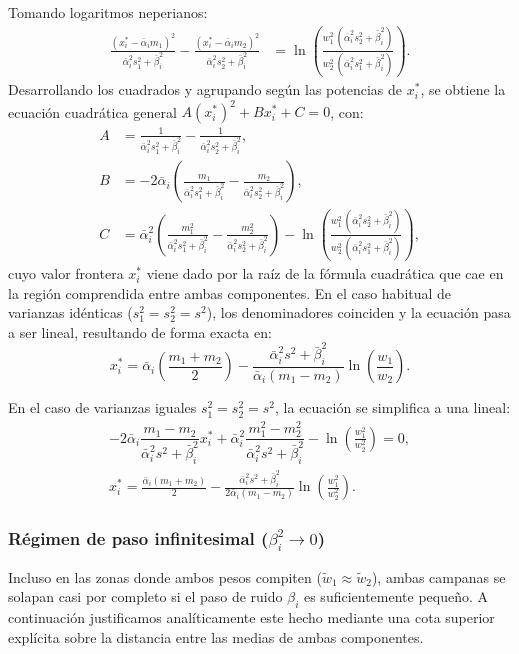 \documentclass[11pt,a4paper]{article}
\begin{document}
Tomando logaritmos neperianos:
\begin{align*}
\frac{(x_i^* - \bar{\alpha}_i m_1)^2}{\bar{\alpha}_i^2 s_1^2 + \bar{\beta}_i^2} - \frac{(x_i^* - \bar{\alpha}_i m_2)^2}{\bar{\alpha}_i^2 s_2^2 + \bar{\beta}_i^2} &= \ln\left( \frac{w_1^2 \, (\bar{\alpha}_i^2 s_2^2 + \bar{\beta}_i^2)}{w_2^2 \, (\bar{\alpha}_i^2 s_1^2 + \bar{\beta}_i^2)} \right).
\end{align*}
Desarrollando los cuadrados y agrupando según las potencias de $x_i^*$, se obtiene la ecuación cuadrática general $A(x_i^*)^2 + Bx_i^* + C = 0$, con:
\begin{align*}
A &= \frac{1}{\bar{\alpha}_i^2 s_1^2 + \bar{\beta}_i^2} - \frac{1}{\bar{\alpha}_i^2 s_2^2 + \bar{\beta}_i^2}, \\
B &= -2 \bar{\alpha}_i \left( \frac{m_1}{\bar{\alpha}_i^2 s_1^2 + \bar{\beta}_i^2} - \frac{m_2}{\bar{\alpha}_i^2 s_2^2 + \bar{\beta}_i^2} \right), \\
C &= \bar{\alpha}_i^2 \left( \frac{m_1^2}{\bar{\alpha}_i^2 s_1^2 + \bar{\beta}_i^2} - \frac{m_2^2}{\bar{\alpha}_i^2 s_2^2 + \bar{\beta}_i^2} \right) - \ln\left( \frac{w_1^2 \, (\bar{\alpha}_i^2 s_2^2 + \bar{\beta}_i^2)}{w_2^2 \, (\bar{\alpha}_i^2 s_1^2 + \bar{\beta}_i^2)} \right),
\end{align*}
cuyo valor frontera $x_i^*$ viene dado por la raíz de la fórmula cuadrática que cae en la región comprendida entre ambas componentes.
En el caso habitual de varianzas idénticas ($s_1^2 = s_2^2 = s^2$), los denominadores coinciden y la ecuación pasa a ser lineal, resultando de forma exacta en:
\[
x_i^* = \bar{\alpha}_i \left(\frac{m_1 + m_2}{2}\right) - \frac{\bar{\alpha}_i^2 s^2 + \bar{\beta}_i^2}{\bar{\alpha}_i (m_1 - m_2)} \ln\left(\frac{w_1}{w_2}\right).
\]

En el caso de varianzas iguales $s_1^2 = s_2^2 = s^2$, la ecuación se simplifica a una lineal:
\begin{gather*}
    -2 \bar{\alpha}_i \dfrac{m_1 - m_2}{\bar{\alpha}_i^2 s^2 + \bar{\beta}_i^2} x_i^* + \bar{\alpha}_i^2 \dfrac{m_1^2 - m_2^2}{\bar{\alpha}_i^2 s^2 + \bar{\beta}_i^2} - \ln\left(\frac{w_1^2}{w_2^2}\right) = 0,\\
    x_i^* = \frac{\bar{\alpha}_i (m_1 + m_2)}{2} - \frac{\bar{\alpha}_i^2 s^2 + \bar{\beta}_i^2}{2\bar{\alpha}_i (m_1 - m_2)} \ln\left(\frac{w_1^2}{w_2^2}\right).
\end{gather*}

\subsubsection{Régimen de paso infinitesimal ($\beta_i^2 \to 0$)}
Incluso en las zonas donde ambos pesos compiten ($\tilde{w}_1 \approx \tilde{w}_2$), ambas campanas se solapan casi por completo si el paso de ruido $\beta_i$ es suficientemente pequeño. A continuación justificamos analíticamente este hecho mediante una cota superior explícita sobre la distancia entre las medias de ambas componentes.\\
\end{document}
